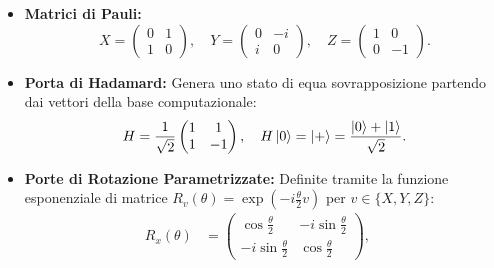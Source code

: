 \begin{itemize}
    \item \textbf{Matrici di Pauli:}
    \begin{equation}
    X = \begin{pmatrix} 0 & 1 \\ 1 & 0 \end{pmatrix}, \quad
    Y = \begin{pmatrix} 0 & -i \\ i & 0 \end{pmatrix}, \quad
    Z = \begin{pmatrix} 1 & 0 \\ 0 & -1 \end{pmatrix}.
    \end{equation}
    \item \textbf{Porta di Hadamard:} Genera uno stato di equa sovrapposizione partendo dai vettori della base computazionale:
    \begin{equation}
    H = \frac{1}{\sqrt{2}}\begin{pmatrix} 1 & 1 \\ 1 & -1 \end{pmatrix}, \quad H\ket{0} = \ket{+} = \frac{\ket{0}+\ket{1}}{\sqrt{2}}.
    \end{equation}
    \item \textbf{Porte di Rotazione Parametrizzate:} Definite tramite la funzione esponenziale di matrice $R_v(\theta) = \exp\left(-i \frac{\theta}{2} v\right)$ per $v \in \{X, Y, Z\}$:
    \begin{align}
    R_x(\theta) &= \begin{pmatrix} \cos\frac{\theta}{2} & -i\sin\frac{\theta}{2} \\ -i\sin\frac{\theta}{2} & \cos\frac{\theta}{2} \end{pmatrix}, \quad

\end{align}
\end{itemize}

